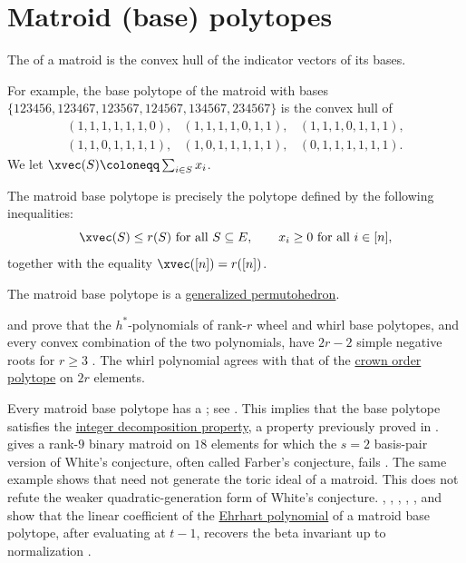 \section[matroidPolytopes]{Matroid (base) polytopes}


\begin{definition}\label{matroidBasePolytope}
The  of a matroid is the convex hull of the
indicator vectors of its bases.
\end{definition}

For example, the base polytope of the matroid with bases
$\{123456,123467,123567,124567,134567,234567\}$ is the convex hull of
\[
\begin{array}{lll}
(1,1,1,1,1,1,0), & (1,1,1,1,0,1,1), & (1,1,1,0,1,1,1), \\
(1,1,0,1,1,1,1), & (1,0,1,1,1,1,1), & (0,1,1,1,1,1,1).
\end{array}
\]
We let $\xvec(S) \coloneqq \sum_{i \in S} x_i$.

\begin{theorem}
The matroid base polytope is precisely the polytope defined by the following
inequalities:
\begin{equation}
  \xvec(S) \leq r(S) \text{ for all $S \subseteq E$}, \qquad x_i \geq 0 \text{ for all $i \in [n]$},
\end{equation}
together with the equality $\xvec([n]) = r([n])$.
\end{theorem}
The matroid base polytope is a
\hyperref[generalizedPermutohedron]{generalized permutohedron}.

 and  prove that the $h^*$-polynomials of
rank-$r$ wheel and whirl base polytopes, and every convex combination of
the two polynomials, have $2r-2$ simple negative roots for $r\geq3$
\cite[Thm.~2]{CaoFu2026x}. The whirl polynomial agrees with that of the
\hyperref[orderPolytope]{crown order polytope} on $2r$ elements.

Every matroid base polytope has a 
\label{regularUnimodularTriangulation}; see \cite{BackmanLiu2023x}.
This implies that the base polytope satisfies the
\hyperref[integerDecompositionProperty]{integer decomposition property},
a property previously proved in \cite{GijswijtRegts2012}.
 gives a rank-$9$ binary matroid on $18$ elements for which
the $s=2$ basis-pair version of White's conjecture, often called Farber's
conjecture, fails \cite{Larson2026x}.  The same example shows that
\label{symmetricExchangeBinomial} need not generate the toric ideal of a
matroid.  This does not refute the weaker quadratic-generation form of
White's conjecture.
, , ,
, , and 
show that the linear coefficient of the \hyperref[ehrhart]{Ehrhart polynomial}
of a matroid base
polytope, after evaluating at $t-1$, recovers the beta invariant up to
normalization \cite{ChavezDorpalenBarryFerroniLiuRinconVindasMelendez2025x}.

